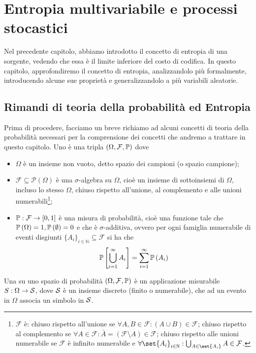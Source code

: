 \chapter{Entropia multivariabile e processi stocastici}

Nel precedente capitolo, abbiamo introdotto il concetto di entropia di una sorgente, vedendo che essa è il limite inferiore del costo di codifica. 
In questo capitolo, approfondiremo il concetto di entropia, analizzandolo più formalmente, introducendo alcune sue proprietà e generalizzandolo a più variabili aleatorie.

\section{Rimandi di teoria della probabilità ed Entropia}

Prima di procedere, facciamo un breve richiamo ad alcuni concetti di teoria della probabilità necessari per la comprensione dei concetti che andremo a trattare in questo capitolo.
Uno  è una tripla \((\Omega, \mathcal{F}, \Prob)\) dove
\begin{itemize}
  \item \(\Omega\) è un insieme non vuoto, detto spazio dei campioni (o spazio campione);
  \item \(\mathcal{F} \subseteq \mathcal{P}(\Omega)\) è una \(\sigma\)-algebra su \(\Omega\), cioè un insieme di sottoinsiemi di \(\Omega\), incluso lo stesso \(\Omega\), chiuso rispetto all'unione, al complemento e alle unioni numerabili\footnote{$\mathcal{F}$ è: chiuso rispetto all'unione se $\forall A,B \in \mathcal{F}: (A \cup B) \in \mathcal{F}$; chiuso rispetto al complemento se $\forall A \in \mathcal{F}: \bar{A}=(\mathcal{F} \setminus A) \in \mathcal{F}$; chiuso rispetto alle unioni numerabile se $\mathcal{F}$ è infinito numerabile e $\forall \set{A_i}_{i \in \mathbb{N}}: \bigcup_{A \in \set{A_i}}A \in \mathcal{F}$.};
  \item \(\Prob: \mathcal{F} \to [0,1]\) è una misura di probabilità, cioè una funzione tale che \(\Prob[\Omega] = 1, \Prob[\emptyset] = 0\) e che è \(\sigma\)-additiva, ovvero per ogni famiglia numerabile di eventi disgiunti \({\{A_i\}}_{i \in \mathbb{N}} \subseteq \mathcal{F}\) si ha che
  \[\Prob\left[\bigcup_{i=1}^{\infty} A_i\right] = \sum_{i=1}^{\infty} \Prob[A_i]\]
\end{itemize}

Una  su uno spazio di probabilità \((\Omega, \mathcal{F}, \Prob)\) è un applicazione misurabile \(S: \Omega \to \mathcal{S}\), dove \(\mathcal{S}\) è un insieme discreto (finito o numerabile), che ad un evento in $\Omega$ associa un simbolo in $\mathcal{S}$.

